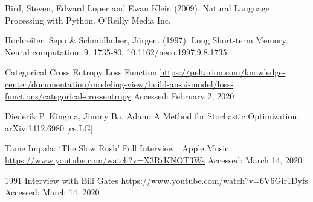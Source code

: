 \documentclass[journal]{IEEEtran}
\begin{document}
\begin{thebibliography}{99}
 Bird, Steven, Edward Loper and Ewan Klein (2009). Natural Language Processing with Python. O’Reilly Media Inc.

 Hochreiter, Sepp \& Schmidhuber, Jürgen. (1997). Long Short-term Memory. Neural computation. 9. 1735-80. 10.1162/neco.1997.9.8.1735. 

 Categorical Cross Entropy Loss Function
\url{https://peltarion.com/knowledge-center/documentation/modeling-view/build-an-ai-model/loss-functions/categorical-crossentropy}
Accessed: February 2, 2020

	Diederik P. Kingma, Jimmy Ba, Adam: A Method for Stochastic Optimization, arXiv:1412.6980 [cs.LG]

 Tame Impala: ‘The Slow Rush’ Full Interview | Apple Music
\url{https://www.youtube.com/watch?v=X3RrKNOT3Ws} Accessed: March 14, 2020

 1991 Interview with Bill Gates
\url{https://www.youtube.com/watch?v=6V6Gir1Dyfs} Accessed: March 14, 2020

\end{thebibliography}
\end{document}
